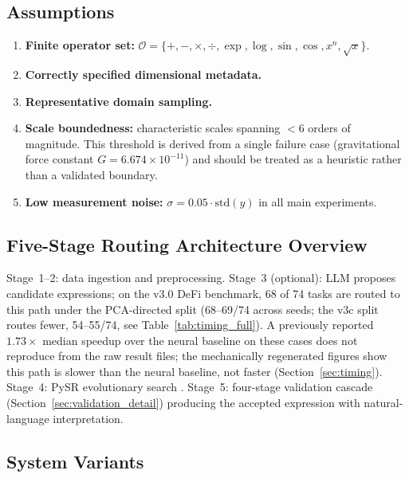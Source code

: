 \documentclass[twoside,11pt]{article}
\begin{document}
\subsection{Assumptions}\label{subsec:assumptions}
\label{sec:assumptions}

\begin{enumerate}
\item \textbf{Finite operator set:}
  $\mathcal{O} = \{+,-,\times,\div,\exp,\log,\sin,\cos,x^n,\sqrt{x}\}$.
\item \textbf{Correctly specified dimensional metadata.}
\item \textbf{Representative domain sampling.}
\item \textbf{Scale boundedness:} characteristic scales spanning
  $<6$ orders of magnitude.
  This threshold is derived from a single failure case (gravitational force
  constant $G = 6.674 \times 10^{-11}$) and should be treated as a heuristic
  rather than a validated boundary.
\item \textbf{Low measurement noise:}
  $\sigma = 0.05 \cdot \mathrm{std}(y)$ in all main experiments.
\end{enumerate}

\subsection{Five-Stage Routing Architecture Overview}\label{subsec:fivestage-routing-architecture-overview}
\label{sec:validation_framework}

Stage~1--2: data ingestion and preprocessing.
Stage~3 (optional): LLM proposes candidate expressions; on the v3.0 DeFi
benchmark, 68 of 74 tasks are routed to this path under the PCA-directed
split (68--69/74 across seeds; the v3c split routes fewer, 54--55/74,
see Table~\ref{tab:timing_full}). A previously reported
$1.73\times$ median speedup over the neural baseline on these cases does
not reproduce from the raw result files; the mechanically regenerated
figures show this path is slower than the neural baseline, not faster
(Section~\ref{sec:timing}).
Stage~4: PySR evolutionary search \citep{cranmer2023pysr}.
Stage~5: four-stage validation cascade (Section~\ref{sec:validation_detail})
producing the accepted expression with natural-language interpretation.

\subsection{System Variants}\label{subsec:system-variants}
\label{sec:arch_variants}
\end{document}
